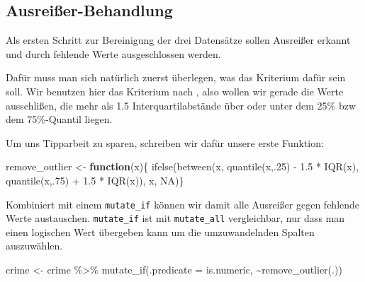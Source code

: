 \documentclass[
]{book}
\newenvironment{Shaded}{\begin{snugshade}}{\end{snugshade}}
\newcommand{\AttributeTok}[1]{\textcolor[rgb]{0.77,0.63,0.00}{#1}}
\newcommand{\ConstantTok}[1]{\textcolor[rgb]{0.00,0.00,0.00}{#1}}
\newcommand{\ControlFlowTok}[1]{\textcolor[rgb]{0.13,0.29,0.53}{\textbf{#1}}}
\newcommand{\DecValTok}[1]{\textcolor[rgb]{0.00,0.00,0.81}{#1}}
\newcommand{\FloatTok}[1]{\textcolor[rgb]{0.00,0.00,0.81}{#1}}
\newcommand{\FunctionTok}[1]{\textcolor[rgb]{0.00,0.00,0.00}{#1}}
\newcommand{\NormalTok}[1]{#1}
\newcommand{\OtherTok}[1]{\textcolor[rgb]{0.56,0.35,0.01}{#1}}
\newcommand{\SpecialCharTok}[1]{\textcolor[rgb]{0.00,0.00,0.00}{#1}}
\begin{document}
\hypertarget{ausreiuxdfer-behandlung}{%
\subsection{Ausreißer-Behandlung}\label{ausreiuxdfer-behandlung}}

Als ersten Schritt zur Bereinigung der drei Datensätze sollen Ausreißer erkannt und durch fehlende Werte ausgeschlossen werden.

Dafür muss man sich natürlich zuerst überlegen, was das Kriterium dafür sein soll. Wir benutzen hier das Kriterium nach \citet{tukeyExploratoryDataAnalysis1977}, also wollen wir gerade die Werte ausschlißen, die mehr als 1.5 Interquartilabstände über oder unter dem 25\% bzw dem 75\%-Quantil liegen.

Um uns Tipparbeit zu sparen, schreiben wir dafür unsere erste Funktion:

\begin{Shaded}
\begin{Highlighting}[]
\NormalTok{remove\_outlier }\OtherTok{\textless{}{-}} \ControlFlowTok{function}\NormalTok{(x)\{}
  \FunctionTok{ifelse}\NormalTok{(}\FunctionTok{between}\NormalTok{(x,}
                 \FunctionTok{quantile}\NormalTok{(x,.}\DecValTok{25}\NormalTok{) }\SpecialCharTok{{-}} \FloatTok{1.5} \SpecialCharTok{*} \FunctionTok{IQR}\NormalTok{(x),}
                 \FunctionTok{quantile}\NormalTok{(x,.}\DecValTok{75}\NormalTok{) }\SpecialCharTok{+} \FloatTok{1.5} \SpecialCharTok{*} \FunctionTok{IQR}\NormalTok{(x)),}
\NormalTok{          x,}
          \ConstantTok{NA}\NormalTok{)\}}
\end{Highlighting}
\end{Shaded}

Kombiniert mit einem \texttt{mutate\_if} können wir damit alle Ausreißer gegen fehlende Werte austauschen. \texttt{mutate\_if} ist mit \texttt{mutate\_all} vergleichbar, nur dass man einen logischen Wert übergeben kann um die umzuwandelnden Spalten auszuwählen.

\begin{Shaded}
\begin{Highlighting}[]
\NormalTok{crime }\OtherTok{\textless{}{-}}\NormalTok{ crime }\SpecialCharTok{\%\textgreater{}\%} 
  \FunctionTok{mutate\_if}\NormalTok{(}\AttributeTok{.predicate =}\NormalTok{ is.numeric,}
            \SpecialCharTok{\textasciitilde{}}\FunctionTok{remove\_outlier}\NormalTok{(.))}
\end{Highlighting}
\end{Shaded}
\end{document}
